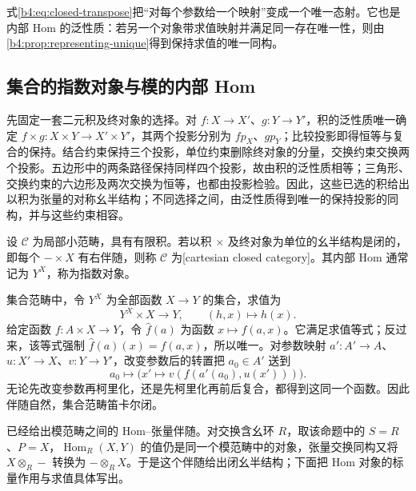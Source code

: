式\eqref{b4:eq:closed-transpose}把“对每个参数给一个映射”变成一个唯一态射。它也是内部 Hom 的泛性质：若另一个对象带求值映射并满足同一存在唯一性，则由\cref{b4:prop:representing-unique}得到保持求值的唯一同构。

\subsection{集合的指数对象与模的内部 Hom}
\label{b4:subsec:closed-sets-modules}

先固定一套二元积及终对象的选择。对 \(f:X\to X'\)、\(g:Y\to Y'\)，积的泛性质唯一确定 \(f\times g:X\times Y\to X'\times Y'\)，其两个投影分别为 \(f p_X\)、\(g p_Y\)；比较投影即得恒等与复合的保持。结合约束保持三个投影，单位约束删除终对象的分量，交换约束交换两个投影。五边形中的两条路径保持同样四个投影，故由积的泛性质相等；三角形、交换约束的六边形及两次交换为恒等，也都由投影检验。因此，这些已选的积给出以积为张量的对称幺半结构；不同选择之间，由泛性质得到唯一的保持投影的同构，并与这些约束相容。

\begin{definition}\label{b4:def:cartesian-closed}
	设 \(\mathcal C\) 为局部小范畴，具有有限积。若以积 \(\times\) 及终对象为单位的幺半结构是闭的，即每个 \(-\times X\) 有右伴随，则称 \(\mathcal C\) 为[cartesian closed category]。其内部 Hom 通常记为 \(Y^X\)，称为指数对象。
\end{definition}

\begin{example}\label{b4:exm:sets-cartesian-closed}
	集合范畴中，令 \(Y^X\) 为全部函数 \(X\to Y\) 的集合，求值为
	\[
		Y^X\times X\longrightarrow Y,\qquad(h,x)\longmapsto h(x).
	\]
	给定函数 \(f:A\times X\to Y\)，令 \(\widehat f(a)\) 为函数 \(x\mapsto f(a,x)\)。它满足求值等式；反过来，该等式强制 \(\widehat f(a)(x)=f(a,x)\)，所以唯一。对参数映射 \(a':A'\to A\)、\(u:X'\to X\)、\(v:Y\to Y'\)，改变参数后的转置把 \(a_0\in A'\) 送到
	\[
		a_0\longmapsto\bigl(x'\longmapsto v(f(a'(a_0),u(x')))\bigr).
	\]
	无论先改变参数再柯里化，还是先柯里化再前后复合，都得到这同一个函数。因此伴随自然，集合范畴笛卡尔闭。
\end{example}

已经给出模范畴之间的 Hom--张量伴随。对交换含幺环 \(R\)，取该命题中的 \(S=R\)、\(P=X\)，\(\operatorname{Hom}_R(X,Y)\) 的值仍是同一个模范畴中的对象，张量交换同构又将 \(X\otimes_R-\) 转换为 \(-\otimes_RX\)。于是这个伴随给出闭幺半结构；下面把 Hom 对象的标量作用与求值具体写出。

